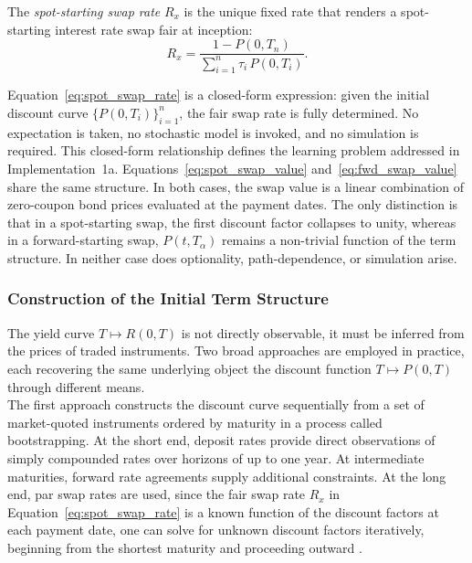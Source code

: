         \begin{definition}
        The \textit{spot-starting swap rate} $R_x$ is the unique fixed rate that renders a spot-starting interest rate swap fair at inception:
        \begin{equation} \label{eq:spot_swap_rate}
        R_x = \frac{1 - P(0, T_n)}{\displaystyle\sum_{i=1}^{n} \tau_i \, P(0, T_i)}.
        \end{equation}
        \end{definition}

        \noindent
        Equation~\eqref{eq:spot_swap_rate} is a closed-form expression: given the initial discount curve $\{P(0, T_i)\}_{i=1}^{n}$, the fair swap rate is fully determined. No expectation is
        taken, no stochastic model is invoked, and no simulation is required. This closed-form relationship defines the learning problem addressed in Implementation~1a. 
        Equations~\eqref{eq:spot_swap_value} and~\eqref{eq:fwd_swap_value} share the same structure. In both cases, the swap value is a linear combination of zero-coupon bond prices evaluated at the payment dates. The only distinction is that in a spot-starting swap, the first discount factor collapses to unity, whereas in a forward-starting swap, $P(t, T_{\alpha})$ remains a non-trivial function of the term structure. In neither case does optionality, path-dependence, or simulation arise. \\

    
    \subsubsection*{Construction of the Initial Term Structure} 
        The yield curve $T \mapsto R(0,T)$ is not directly observable, it must be inferred from the prices of traded instruments. Two broad approaches are employed in practice, each recovering
        the same underlying object the discount function $T \mapsto P(0,T)$ through different means.\\

        \noindent
        The first approach constructs the discount curve sequentially from a set of market-quoted instruments ordered by maturity in a process called bootstrapping. At the short end, deposit rates provide direct observations of simply compounded rates over horizons of up to one year. At intermediate maturities, forward rate agreements supply additional constraints. At the long end, par swap rates are used, since the fair swap rate $R_x$ in Equation~\eqref{eq:spot_swap_rate} is a known function of the discount factors at each payment date, one can solve for unknown discount factors iteratively, beginning from the shortest maturity and proceeding outward \cite{Hull2022, Tuckman2011}. \\

